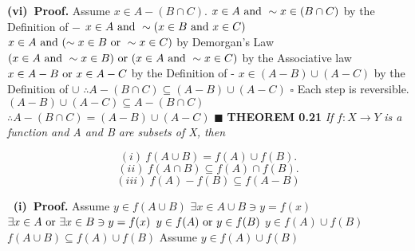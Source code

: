 \documentclass[12pt]{article}
\begin{document}
	\newline
	\textbf{(vi)\ Proof.}
	Assume \(x \in A - (B \cap C)\).
	\newline
	\(x \in A \textup{ and } \sim x \in (B \cap C)\) by the Definition of \(-\)
	\newline
	\(x \in A \textup{ and } \sim (x \in B \textup{ and } x \in C)\)
	\newline
	\(x \in A \textup{ and } (\sim x \in B \textup{ or } \sim x \in C)\) by Demorgan's Law
	\newline
	\((x \in A \textup{ and } \sim x \in B) \textup{ or } (x \in A \textup{ and } \sim x \in C)\) by the Associative law
	\newline
	\(x \in A - B \textup{ or } x \in A - C\) by the Definition of -
	\newline
	\(x \in (A - B) \cup (A - C)\) by the Definition of \(\cup\)
	\newline
	\(\therefore A - (B \cap C) \subseteq (A - B) \cup (A - C)\)
	\newline \(\square\) \newline
	Each step is reversible.
	\newline
	\((A - B) \cup (A - C) \subseteq A - (B \cap C)\)
	\newline
	\(\therefore A - (B \cap C) = (A - B) \cup (A - C)\)
	\newline \(\blacksquare\)
	\newpage
	\textbf{THEOREM 0.21} \textit{If} \(f:X \rightarrow Y\) \textit{is a function and A and B are subsets of X, then}
	\begin{adjustwidth}{-2cm}{0cm}
		\begin{flushleft}
		\[(i)\ f(A\cup B) = f(A) \cup f(B). \]
		\[(ii)\ f(A \cap B) \subseteq f(A) \cap f(B). \]
		\[(iii)\ f(A) - f(B) \subseteq f(A - B) \]
	\end{flushleft}
	\end{adjustwidth}
	\(\ \) \newline
	\textbf{(i)\ Proof.}
	\newline
	Assume \(y \in f(A\cup B)\)
	\newline
	\(\exists x \in A \cup B \ni y = f(x)\)
	\newline
	\(\exists x \in A \textup{ or }\exists x \in B \ni y = f(x)\)
	\newline
	\(y \in f(A) \textup{ or }y \in f(B)\)
	\newline
	\(y \in f(A) \cup f(B)\)
	\newline
	\(f(A \cup B) \subseteq f(A) \cup f(B)\)
	\newline
	Assume \(y \in f(A) \cup f(B)\)
\end{document}
